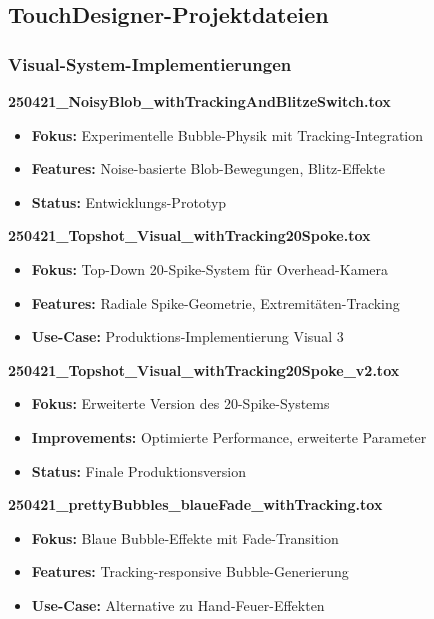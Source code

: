 \subsection{TouchDesigner-Projektdateien}

\subsubsection{Visual-System-Implementierungen}

\textbf{250421\_NoisyBlob\_withTrackingAndBlitzeSwitch.tox}
\begin{itemize}
    \item \textbf{Fokus:} Experimentelle Bubble-Physik mit Tracking-Integration
    \item \textbf{Features:} Noise-basierte Blob-Bewegungen, Blitz-Effekte
    \item \textbf{Status:} Entwicklungs-Prototyp
\end{itemize}

\textbf{250421\_Topshot\_Visual\_withTracking20Spoke.tox}
\begin{itemize}
    \item \textbf{Fokus:} Top-Down 20-Spike-System für Overhead-Kamera
    \item \textbf{Features:} Radiale Spike-Geometrie, Extremitäten-Tracking
    \item \textbf{Use-Case:} Produktions-Implementierung Visual 3
\end{itemize}

\textbf{250421\_Topshot\_Visual\_withTracking20Spoke\_v2.tox}
\begin{itemize}
    \item \textbf{Fokus:} Erweiterte Version des 20-Spike-Systems
    \item \textbf{Improvements:} Optimierte Performance, erweiterte Parameter
    \item \textbf{Status:} Finale Produktionsversion
\end{itemize}

\textbf{250421\_prettyBubbles\_blaueFade\_withTracking.tox}
\begin{itemize}
    \item \textbf{Fokus:} Blaue Bubble-Effekte mit Fade-Transition
    \item \textbf{Features:} Tracking-responsive Bubble-Generierung
    \item \textbf{Use-Case:} Alternative zu Hand-Feuer-Effekten
\end{itemize}

